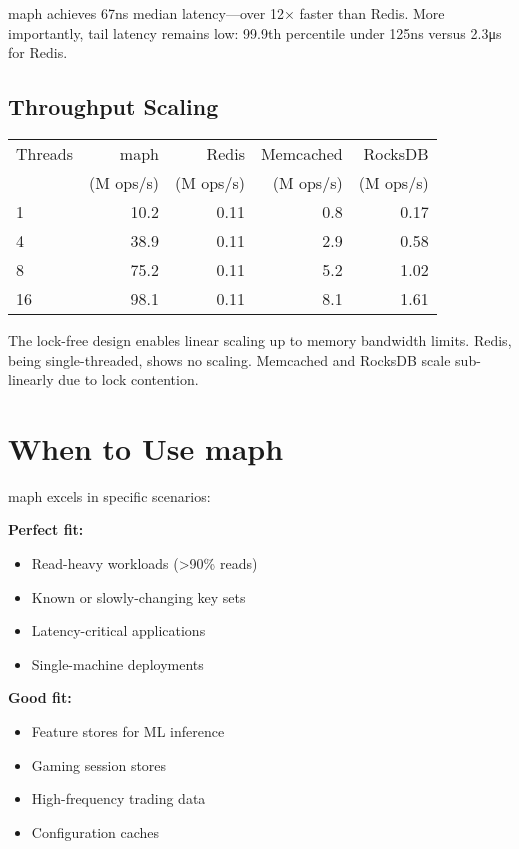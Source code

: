 \documentclass[11pt]{article}
\begin{document}
maph achieves 67ns median latency—over 12× faster than Redis. More importantly, tail latency remains low: 99.9th percentile under 125ns versus 2.3μs for Redis.

\subsection{Throughput Scaling}

\begin{center}
\begin{tabular}{lrrrr}
\toprule
Threads & maph & Redis & Memcached & RocksDB \\
& (M ops/s) & (M ops/s) & (M ops/s) & (M ops/s) \\
\midrule
1 & 10.2 & 0.11 & 0.8 & 0.17 \\
4 & 38.9 & 0.11 & 2.9 & 0.58 \\
8 & 75.2 & 0.11 & 5.2 & 1.02 \\
16 & 98.1 & 0.11 & 8.1 & 1.61 \\
\bottomrule
\end{tabular}
\end{center}

The lock-free design enables linear scaling up to memory bandwidth limits. Redis, being single-threaded, shows no scaling. Memcached and RocksDB scale sub-linearly due to lock contention.

\section{When to Use maph}

maph excels in specific scenarios:

\textbf{Perfect fit:}
\begin{itemize}
\item Read-heavy workloads (>90\% reads)
\item Known or slowly-changing key sets
\item Latency-critical applications
\item Single-machine deployments
\end{itemize}

\textbf{Good fit:}
\begin{itemize}
\item Feature stores for ML inference
\item Gaming session stores
\item High-frequency trading data
\item Configuration caches
\end{itemize}
\end{document}
